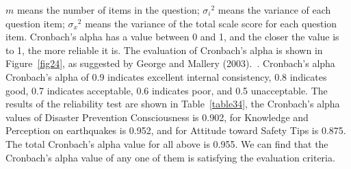 $m$ means the number of items in the question; ${\sigma_i}^2$ means the variance of each question item; ${\sigma_x}^2$ means the variance of the total scale score for each question item. Cronbach's alpha has a value between 0 and 1, and the closer the value is to 1, the more reliable it is. The evaluation of Cronbach's alpha is shown in Figure~\ref{fig24}, as suggested by George and Mallery (2003).~\cite{ref1}. Cronbach's alpha  Cronbach's alpha of 0.9 indicates excellent internal consistency, 0.8 indicates good, 0.7 indicates acceptable, 0.6 indicates poor, and 0.5 unacceptable. The results of the reliability test are shown in Table~\ref{table34}, the Cronbach's alpha values of Disaster Prevention Consciousness is 0.902, for Knowledge and Perception on earthquakes is 0.952, and for Attitude toward Safety Tips is 0.875. The total Cronbach's alpha value for all above is 0.955. We can find that the Cronbach's alpha value of any one of them is satisfying the evaluation criteria.




